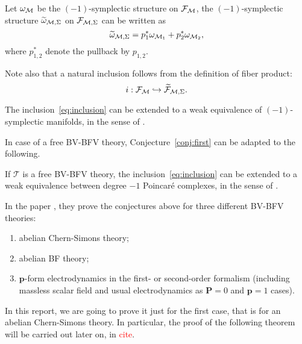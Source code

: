 Let $\omega_{\mathcal{M}}$ be the $(-1)$-symplectic structure on $\mathcal{F}_{\mathcal{M}}$, the $(-1)$-symplectic structure $\widetilde{\omega}_{\mathcal{M},\Sigma}$ on $\mathcal{F}_{\mathcal{M},\Sigma}$ can be written as
\begin{equation}
\label{eq:wt_omega}
    \widetilde{\omega}_{\mathcal{M},\Sigma} = 
    p_1^* \omega_{\mathcal{M}_1} + p_2^* \omega_{\mathcal{M}_2} ,
\end{equation}
where $p_{1,2}^*$ denote the pullback by $p_{1,2}$.

Note also that a natural inclusion follows from the definition of fiber product:
\begin{equation}
\label{eq:inclusion}
    i : \mathcal{F}_{\mathcal{M}} \hookrightarrow \widetilde{\mathcal{F}}_{\mathcal{M},\Sigma} .
\end{equation}

\begin{conj}
\label{conj:first}
    The inclusion~\ref{eq:inclusion} can be extended to a weak equivalence of $(-1)$-symplectic manifolds, in the sense of .
\end{conj}

In case of a free BV-BFV theory, Conjecture~\ref{conj:first} can be adapted to the following.

\begin{conj}
\label{conj:second}
    If $\mathcal{T}$ is a free BV-BFV theory, the inclusion~\ref{eq:inclusion} can be extended to a weak equivalence between degree $-1$ Poincaré complexes, in the sense of .
\end{conj}

In the paper \cite{Gluing_BV-BFV}, they prove the conjectures above for three different BV-BFV theories:
\begin{enumerate}[label={\arabic*)}]
    \item abelian Chern-Simons theory;
    \item abelian BF theory;
    \item $\mathbf{p}$-form electrodynamics in the first- or second-order formalism (including massless scalar field and usual electrodynamics as $\mathbf{P} = 0$ and $\mathbf{p} = 1$ cases).
\end{enumerate}

In this report, we are going to prove it just for the first case, that is for an abelian Chern-Simons theory.
In particular, the proof of the following theorem will be carried out later on, in \textcolor{red}{cite}.

